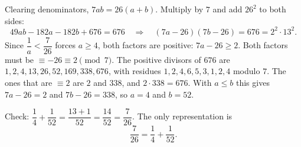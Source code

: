 Clearing denominators, $7ab=26(a+b)$. Multiply by $7$ and add $26^2$ to both sides:
\[49ab-182a-182b+676=676\quad\Longrightarrow\quad(7a-26)(7b-26)=676=2^2\cdot13^2 .\]
Since $\dfrac{1}{a}<\dfrac{7}{26}$ forces $a\ge4$, both factors are positive: $7a-26\ge2$. Both factors must be $\equiv-26\equiv2\pmod7$. The positive divisors of $676$ are $1,2,4,13,26,52,169,338,676$, with residues $1,2,4,6,5,3,1,2,4$ modulo $7$. The ones that are $\equiv2$ are $2$ and $338$, and $2\cdot338=676$. With $a\le b$ this gives $7a-26=2$ and $7b-26=338$, so $a=4$ and $b=52$.

Check: $\dfrac{1}{4}+\dfrac{1}{52}=\dfrac{13+1}{52}=\dfrac{14}{52}=\dfrac{7}{26}$. The only representation is
\[\boxed{\dfrac{7}{26}=\dfrac{1}{4}+\dfrac{1}{52}}.\]
